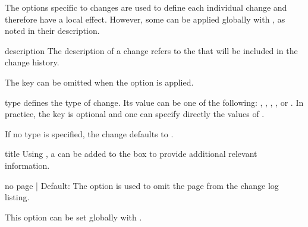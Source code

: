 \documentclass[11pt]{article}
\begin{document}
The options specific to changes are used to define each individual change and therefore have a local effect. However, some can be applied globally with , as noted in their description.

\begin{Optiondef}{description}{}{}
    The description of a change refers to the  that will be included in the change history.

    The  key can be omitted when the  option is applied.
\end{Optiondef}

\begin{Optiondef}{type}{}{}
     defines the type of change. Its value can be one of the following: , , , , or . In practice, the key  is optional and one can specify directly the values of .

    If no type is specified, the change defaults to .
\end{Optiondef}

\begin{PDListing}
\end{PDListing}

\begin{Optiondef}{title}{}{}
    Using , a  can be added to the box to provide additional relevant information.
\end{Optiondef}

\begin{PDListing}
\end{PDListing}


\begin{Optiondef}{no page}{ | }{Default: }
    The  option is used to omit the page from the change log listing.

    This option can be set globally with .
\end{Optiondef}
\end{document}
